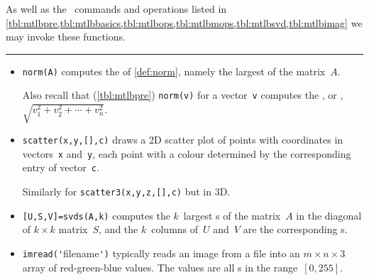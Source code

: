 \begin{table}
\caption{As well as the \script\ commands and operations listed in 
\cref{tbl:mtlbpre,tbl:mtlbbasics,tbl:mtlbops,tbl:mtlbmops,tbl:mtlbsvd,tbl:mtlbimag}  we may invoke these functions.} \label{tbl:mtlbnorm}
\hrule
\begin{minipage}{\linewidth}
\begin{itemize}
\item {}\verb|norm(A)| computes the  of \cref{def:norm}, namely the largest  of the matrix~\(A\).

Also recall that (\cref{tbl:mtlbpre}) \verb|norm(v)| for a vector~\verb|v| computes the , or , \(\sqrt{v_1^2+v_2^2+\cdots+v_n^2}\).



\item {}\verb|scatter(x,y,[],c)| draws a 2D scatter plot of points with coordinates in vectors~\verb|x| and~\verb|y|, each point with a colour determined by the corresponding entry of vector~\verb|c|.  

Similarly for \verb|scatter3(x,y,z,[],c)| but in 3D.

\item {}\verb|[U,S,V]=svds(A,k)| computes the \(k\)~largest s of the matrix~\(A\) in the diagonal of \(k\times k\) matrix~\(S\), and the  \(k\)~columns of~\(U\) and~\(V\) are the corresponding s.


\item  {}\verb|imread('|filename\verb|')| typically reads an image from a file into an \(m\times n\times 3\) array of red-green-blue values. 
The values are all s in the range~\([0,255]\).


\end{itemize}
\end{minipage}
\end{table}

